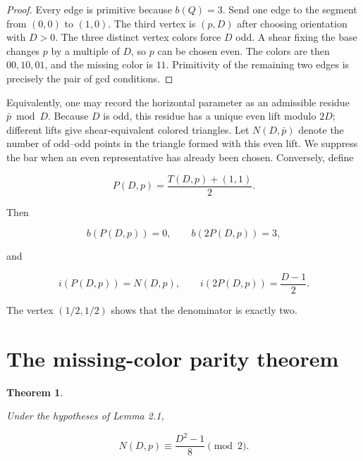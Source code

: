 \documentclass[11pt]{article}
\newtheorem{theorem}{Theorem}[section]
\theoremstyle{remark}
\numberwithin{equation}{section}
\begin{document}
\begin{proof}

Every edge is primitive because $b(Q)=3$. Send one edge to the segment from $(0,0)$ to $(1,0)$. The third vertex is $(p,D)$ after choosing orientation with $D>0$. The three distinct vertex colors force $D$ odd. A shear fixing the base changes $p$ by a multiple of $D$, so $p$ can be chosen even. The colors are then $00,10,01$, and the missing color is $11$. Primitivity of the remaining two edges is precisely the pair of gcd conditions.
\end{proof}


Equivalently, one may record the horizontal parameter as an admissible residue
$\bar p\bmod D$. Because $D$ is odd, this residue has a unique even lift modulo
$2D$; different lifts give shear-equivalent colored triangles. Let
$N(D,\bar p)$ denote the number of odd--odd points in the triangle formed with
this even lift. We suppress the bar when an even representative has already
been chosen. Conversely, define

\[
P(D,p)=\frac{T(D,p)+(1,1)}2.
\]

Then

\[
b(P(D,p))=0,\qquad b(2P(D,p))=3,
\]

and

\[
i(P(D,p))=N(D,p),\qquad i(2P(D,p))=\frac{D-1}{2}.
\]

The vertex $(1/2,1/2)$ shows that the denominator is exactly two.

\section{The missing-color parity theorem}


\begin{theorem}\label{thm:missing-color}

Under the hypotheses of Lemma 2.1,

\[
N(D,p)\equiv\frac{D^2-1}{8}\pmod2.
\]

\end{theorem}
\end{document}
